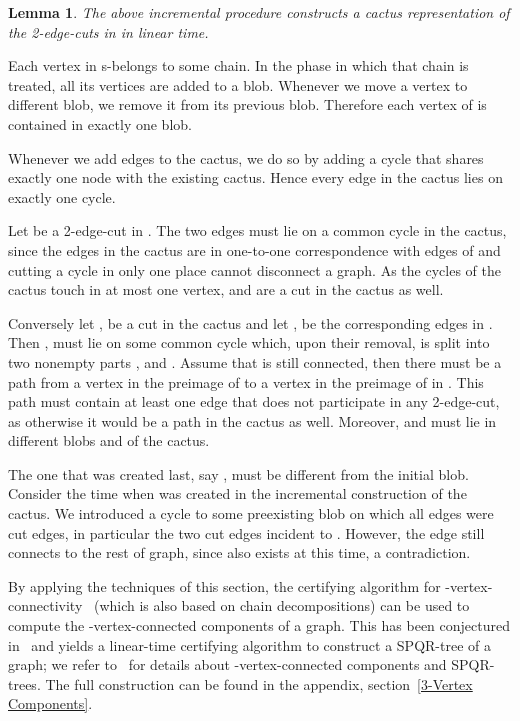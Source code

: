 \documentclass[paper=a4]{scrartcl}
\newtheorem{lemma}{Lemma}
\newcommand{\mqed}{\hfill}
\newlength{\proofpostskipamount}\newlength{\proofpreskipamount}
\newenvironment{proof}{\par\vspace{\proofpreskipamount}\noindent{\textbf{Proof:}}\hspace{0.5em}}{\nopagebreak \strut\nopagebreak \hspace{\fill}\mqed\par\vspace{\proofpostskipamount}\noindent}
\begin{document}
\begin{lemma} The above incremental procedure constructs a cactus representation of the 2-edge-cuts in  in linear time.
\end{lemma}
\begin{proof} Each vertex in  s-belongs to some chain. In the phase in which that chain is treated, all its vertices are added to a blob. Whenever we move a vertex to different blob, we remove it from its previous blob. Therefore each vertex of  is contained in exactly one blob.

Whenever we add edges to the cactus, we do so by adding a cycle that shares exactly one node with the existing cactus. Hence every edge in the cactus lies on exactly one cycle.

Let  be a 2-edge-cut in . The two edges must lie on a common cycle in the cactus, since the edges in the cactus are in one-to-one correspondence with edges of  and cutting a cycle in only one place cannot disconnect a graph. As the cycles of the cactus touch in at most one vertex,  and  are a cut in the cactus as well.

Conversely let ,  be a cut in the cactus and let ,  be the corresponding edges in . Then ,  must lie on some common cycle which, upon their removal, is split into two nonempty parts , and . Assume that  is still connected, then there must be a path from a vertex in the preimage of  to a vertex in the preimage of  in . This path must contain at least one edge  that does not participate in any 2-edge-cut, as otherwise it would be a path in the cactus as well. Moreover,  and  must lie in different blobs  and  of the cactus.

The one that was created last, say , must be different from the initial blob. Consider the time when  was created in the incremental construction of the cactus. We introduced a cycle to some preexisting blob  on which all edges were cut edges, in particular the two cut edges incident to . However, the edge  still connects  to the rest of graph, since  also exists at this time, a contradiction.
\end{proof}

By applying the techniques of this section, the certifying algorithm for -vertex-connectivity~\cite{Schmidt2013} (which is also based on chain decompositions) can be used to compute the -vertex-connected components of a graph. This has been conjectured in~\cite[p.\ 18]{Schmidt2010b} and yields a linear-time certifying algorithm to construct a SPQR-tree of a graph; we refer to~\cite{Hopcroft1973,Gutwenger2001} for details about -vertex-connected components and SPQR-trees. The full construction can be found in the appendix, section~\ref{3-Vertex Components}.
\end{document}
